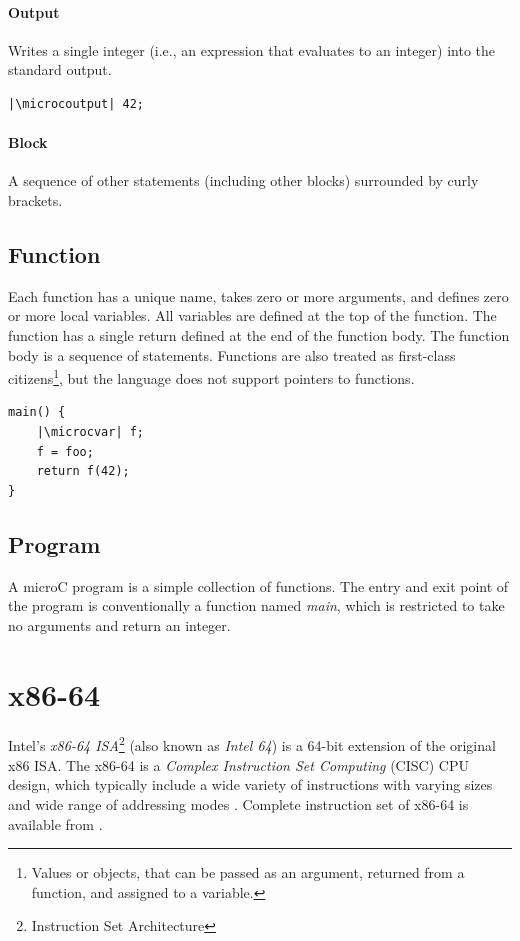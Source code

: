 \documentclass[thesis=M,english]{FITthesis}[2019/12/23]
\newcommand{\microcvar}{\textcolor{codegreen}{\textbf{var}}}
\newcommand{\microcoutput}{\textcolor{codeblue}{output}}
\begin{document}
\paragraph*{Output} Writes a single integer (i.e., an expression that evaluates to an integer) into the standard output.
\begin{verbatim}
|\microcoutput| 42;
\end{verbatim}

\paragraph*{Block} A sequence of other statements (including other blocks) surrounded by curly brackets.

\subsection{Function} Each function has a unique name, takes zero or more arguments, and defines zero or more local variables. All variables are defined at the top of the function. The function has a single return defined at the end of the function body. The function body is a sequence of statements. Functions are also treated as first-class citizens\footnote{Values or objects, that can be passed as an argument, returned from a function, and assigned to a variable.}, but the language does not support pointers to functions.
\begin{verbatim}
main() {
    |\microcvar| f;
    f = foo;
    return f(42);
}
\end{verbatim}

\subsection{Program} A microC program is a simple collection of functions. The entry and exit point of the program is conventionally a function named \emph{main}, which is restricted to take no arguments and return an integer.


\section{x86-64}\label{sec:x86-64}
Intel's \emph{x86-64 ISA}\footnote{Instruction Set Architecture} (also known as \emph{Intel 64}) is a 64-bit extension of the original x86 ISA. The x86-64 is a \emph{Complex Instruction Set Computing} (CISC) CPU design, which typically include a wide variety of instructions with varying sizes and wide range of addressing modes \cite[Chap. 1.0]{x86_assembly}. Complete instruction set of x86-64 is available from \cite{intel_x86}.
\end{document}
